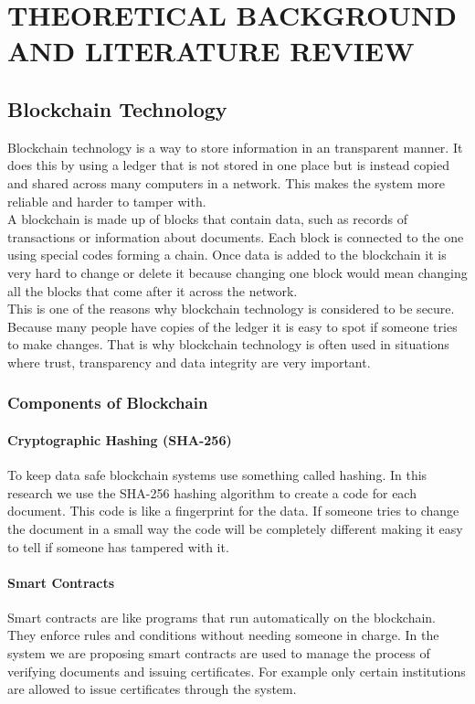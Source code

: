 \chapter{THEORETICAL BACKGROUND AND LITERATURE REVIEW}\label{ch:litrev}

\section{Blockchain Technology}
    Blockchain technology is a way to store information in an transparent manner. It does this by using a ledger that is not stored in one place but is instead copied and shared across many computers in a network. This makes the system more reliable and harder to tamper with.
    \\
    A blockchain is made up of blocks that contain data, such as records of transactions or information about documents. Each block is connected to the one using special codes forming a chain. Once data is added to the blockchain it is very hard to change or delete it because changing one block would mean changing all the blocks that come after it across the network.
    \\
    This is one of the reasons why blockchain technology is considered to be secure. Because many people have copies of the ledger it is easy to spot if someone tries to make changes. That is why blockchain technology is often used in situations where trust, transparency and data integrity are very important.

    \subsection{Components of Blockchain}
        \subsubsection{Cryptographic Hashing (SHA-256)}
            To keep data safe blockchain systems use something called hashing. In this research we use the SHA-256 hashing algorithm to create a code for each document. This code is like a fingerprint for the data. If someone tries to change the document in a small way the code will be completely different making it easy to tell if someone has tampered with it.
        \subsubsection{Smart Contracts}
            Smart contracts are like programs that run automatically on the blockchain. They enforce rules and conditions without needing someone in charge. In the system we are proposing smart contracts are used to manage the process of verifying documents and issuing certificates. For example only certain institutions are allowed to issue certificates through the system.
